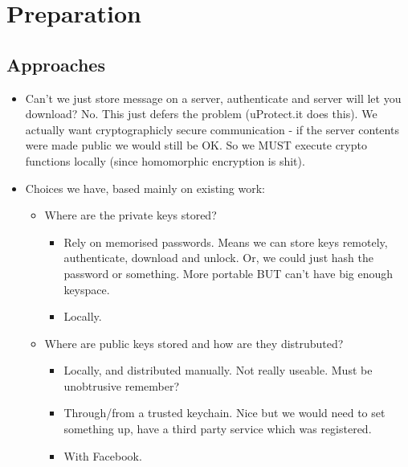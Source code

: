 \chapter{Preparation}\label{ch:preparation}

\section{Approaches}
    \begin{itemize}
        
        \item Can't we just store message on a server, authenticate and server will let you download? No. This just defers the problem (uProtect.it does this). We actually want cryptographicly secure communication - if the server contents were made public we would still be OK. So we MUST execute crypto functions locally (since homomorphic encryption is shit).
        
        \item Choices we have, based mainly on existing work:
        \begin{itemize}
                
        \item Where are the private keys stored?
            \begin{itemize}
                \item Rely on memorised passwords. Means we can store keys remotely, authenticate, download and unlock. Or, we could just hash the password or something. More portable BUT can't have big enough keyspace.
                \item Locally.
            \end{itemize}
                
        \item Where are public keys stored and how are they distrubuted?
            \begin{itemize}
                \item Locally, and distributed manually. Not really useable. Must be unobtrusive remember?
                \item Through/from a trusted keychain. Nice but we would need to set something up, have a third party service which was registered. 
                \item With Facebook.
            \end{itemize}
                

\end{itemize}
\end{itemize}
